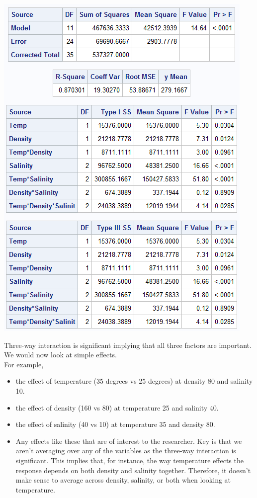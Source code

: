 \begin{flushleft}
\includegraphics[scale=0.7]{Shrimp}
\end{flushleft}

Three-way interaction is significant implying that all three factors are important.  We would now look at simple effects.  \\

For example, 
\begin{itemize}
\item the effect of temperature (35 degrees vs 25 degrees) at density 80 and salinity 10.
\item the effect of density (160 vs 80) at temperature 25 and salinity 40.
\item the effect of salinity (40 vs 10) at temperature 35 and density 80.
\item Any effects like these that are of interest to the researcher.  Key is that we aren't averaging over any of the variables as the three-way interaction is significant. This implies that, for instance, the way temperature effects the response depends on both density and salinity together.  Therefore, it doesn't make sense to average across density, salinity, or both when looking at temperature.
\end{itemize}

